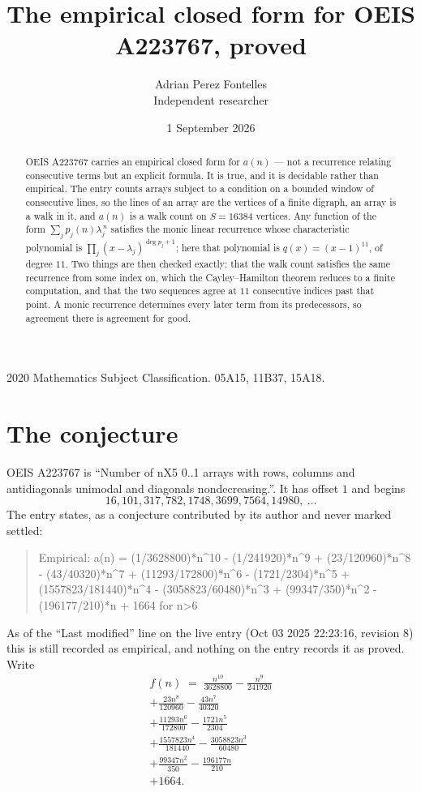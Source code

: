\documentclass[11pt,a4paper]{article}
\title{The empirical closed form for OEIS A223767, proved}
\author{Adrian Perez Fontelles\\ \small Independent researcher}
\date{1 September 2026}
\theoremstyle{plain}
\theoremstyle{definition}
\begin{document}
\maketitle

\begin{abstract}
OEIS A223767 carries an empirical closed form for $a(n)$ --- not a recurrence relating
consecutive terms but an explicit formula. It is true, and it is decidable rather than
empirical. The entry counts arrays subject to a condition on a bounded window of consecutive lines, so the lines of an array are the
vertices of a finite digraph, an array is a walk in it, and $a(n)$ is a walk count on
$S=16384$ vertices. Any function of the form $\sum_j p_j(n)\lambda_j^{\,n}$ satisfies the
monic linear recurrence whose characteristic polynomial is
$\prod_j(x-\lambda_j)^{\deg p_j+1}$; here that polynomial is $q(x)=(x-1)^{11}$, of degree
$11$. Two things are then checked exactly: that the walk count satisfies the same
recurrence from some index on, which the Cayley--Hamilton theorem reduces to a finite
computation, and that the two sequences agree at $11$ consecutive indices past that
point. A monic recurrence determines every later term from its predecessors, so agreement
there is agreement for good.
\end{abstract}

\noindent\small 2020 Mathematics Subject Classification. 05A15, 11B37, 15A18.\normalsize

\section{The conjecture}

OEIS A223767 is ``Number of nX5 0..1 arrays with rows, columns and antidiagonals unimodal and diagonals nondecreasing.''. It has offset $1$ and begins
\[
16, 101, 317, 782, 1748, 3699, 7564, 14980,\ \dots
\]
The entry states, as a conjecture contributed by its author and never marked settled:
\begin{quote}
Empirical: a(n) = (1/3628800)*n\^{}10 - (1/241920)*n\^{}9 + (23/120960)*n\^{}8 - (43/40320)*n\^{}7 + (11293/172800)*n\^{}6 - (1721/2304)*n\^{}5 + (1557823/181440)*n\^{}4 - (3058823/60480)*n\^{}3 + (99347/350)*n\^{}2 - (196177/210)*n + 1664 for n>6
\end{quote}
As of the ``Last modified'' line on the live entry (Oct 03 2025 22:23:16, revision 8) this is still
recorded as empirical, and nothing on the entry records it as proved. Write
\begin{multline*}
f(n)\;=\;\frac{n^{10}}{3628800} - \frac{n^{9}}{241920} \\
+ \frac{23 n^{8}}{120960} - \frac{43 n^{7}}{40320} \\
+ \frac{11293 n^{6}}{172800} - \frac{1721 n^{5}}{2304} \\
+ \frac{1557823 n^{4}}{181440} - \frac{3058823 n^{3}}{60480} \\
+ \frac{99347 n^{2}}{350} - \frac{196177 n}{210} \\
+ 1664.
\end{multline*}
\end{document}
